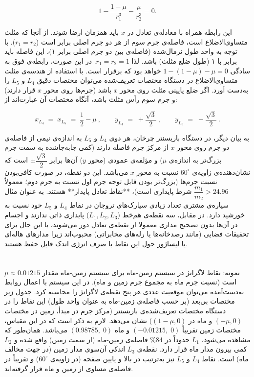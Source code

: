 $$1 - \dfrac{1-\mu}{r_1^3} - \dfrac{\mu}{r_2^3} = 0.$$

این رابطه همراه با معادله‌ی تعادل در $x$ باید همزمان ارضا شوند. از آنجا که مثلث متساوی‌الاضلاع است، فاصله‌ی جرم سوم از هر دو جرم اصلی برابر است ($r_1 = r_2$). با توجه به واحد طول نرمال‌شده (فاصله‌ی بین دو جرم اصلی برابر ۱)، این فاصله باید برابر با ۱ (طول ضلع مثلث) باشد. لذا $r_1 = r_2 = 1$. در این صورت، رابطه‌ی فوق به سادگی $1 - (1-\mu) - \mu = 0$ خواهد بود که برقرار است. با استفاده از هندسه‌ی مثلث متساوی‌الاضلاع در دستگاه مختصات تعریف‌شده می‌توان مختصات دقیق $L_4$ و $L_5$ را به‌دست آورد. اگر ضلع پایینی مثلث روی محور $x$ باشد (جرم‌ها روی محور $x$ قرار دارند) و جرم سوم رأس مثلث باشد، آنگاه مختصات آن عبارت‌اند از:

$$ 
x_{L_4} \;=\; x_{L_5} \;=\; \dfrac{1}{2} - \mu~, \qquad 
y_{L_4} \;=\; +\dfrac{\sqrt{3}}{2}~, \qquad 
y_{L_5} \;=\; -\dfrac{\sqrt{3}}{2}~.
$$

به بیان دیگر، در دستگاه باریسنتر چرخان، هر دوی $L_4$ و $L_5$ به اندازه‌ی نیمی از فاصله‌ی دو جرم روی محور $x$ از مرکز جرم فاصله دارند (کمی جابه‌جا‌شده به سمت جرم بزرگ‌تر به اندازه‌ی $\mu$) و مؤلفه‌ی عمودی (محور $y$) آن‌ها برابر $\pm\dfrac{\sqrt{3}}{2}$ است که نشان‌دهنده‌ی زاویه‌ی $60^\circ$ نسبت به محور $x$ می‌باشد. این دو نقطه، در صورت کافی‌بودن نسبت جرم‌ها (بزرگ‌تر بودن قابل توجه جرم اول نسبت به جرم دوم؛ معمولاً $\dfrac{m_1}{m_2} > 24.96$ شرط پایداری است)، **نقاط تعادل پایدار** هستند. به عنوان مثال سیاره‌ی مشتری تعداد زیادی سیارک‌های تروجان در نقاط $L_4$ و $L_5$ خود نسبت به خورشید دارد. در مقابل، سه نقطه‌ی هم‌خط ($L_1,L_2,L_3$) پایداری ذاتی ندارند و اجسام در آن‌ها بدون تصحیح مداری معمولا از نقطه‌ی تعادل دور می‌شوند، با این حال برای تحقیقات فضایی (مانند رصدخانه‌ها یا رله‌های مخابراتی) محبوب‌اند زیرا مدارهای هاله‌ای یا لیساژور حول این نقاط با صرف انرژی اندک قابل حفظ هستند.

\section{} نمونه: نقاط لاگرانژ در سیستم زمین-ماه  
برای سیستم زمین-ماه مقدار $\mu \approx 0.01215$ است (نسبت جرم ماه به مجموع جرم زمین و ماه). در این سیستم با اعمال روابط به‌دست‌آمده می‌توان موقعیت عددی هر پنج نقطه‌ی لاگرانژ را محاسبه کرد. جدول زیر مختصات بی‌بعد (بر حسب فاصله‌ی زمین-ماه به عنوان واحد طول) این نقاط را در دستگاه مختصات تعریف‌شده‌ی باریسنتر (مرکز جرم در مبدأ، زمین در مختصات $(-\mu,0)$ و ماه در $(1-\mu,0)$) نشان می‌دهد. لازم به ذکر است که در این مقیاس، مختصات زمین تقریباً $(-0.01215,\;0)$ و ماه $(0.98785,\;0)$ می‌باشد. همان‌طور که مشاهده می‌شود، $L_1$ حدوداً در 84\% فاصله‌ی زمین-ماه (از سمت زمین) واقع شده و $L_2$ کمی بیرون مدار ماه قرار دارد. نقطه‌ی $L_3$ اندکی آن‌سوی مدار زمین (در جهت مخالف ماه) است. نقاط $L_4$ و $L_5$ نیز به‌ترتیب در بالا و پایین صفحه (در زاویه‌ی $60^\circ$) و تقریباً در فاصله‌ی مساوی از زمین و ماه قرار گرفته‌اند.

